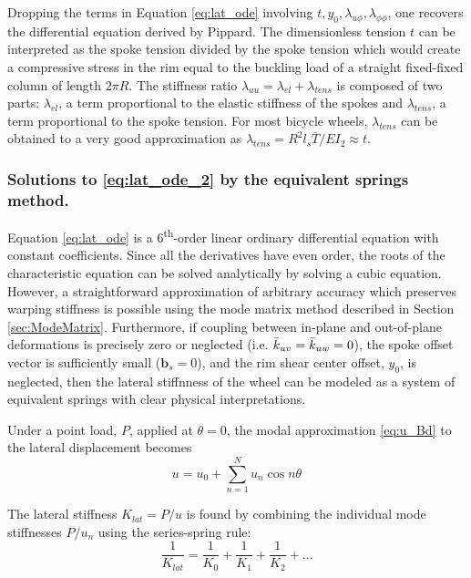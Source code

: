 \documentclass[\rootdir/thesis.tex]{subfiles}
\begin{document}
Dropping the terms in Equation \eqref{eq:lat_ode} involving $t, y_0, \lambda_{u\phi}, \lambda_{\phi\phi}$, one recovers the differential equation derived by Pippard\cite{Pippard}. The dimensionless tension $t$ can be interpreted as the spoke tension divided by the spoke tension which would create a compressive stress in the rim equal to the buckling load of a straight fixed-fixed column of length $2\pi R$. The stiffness ratio $\lambda_{uu}=\lambda_{el}+\lambda_{tens}$ is composed of two parts: $\lambda_{el}$, a term proportional to the elastic stiffness of the spokes and $\lambda_{tens}$, a term proportional to the spoke tension. For most bicycle wheels, $\lambda_{tens}$ can be obtained to a very good approximation as $\lambda_{tens} = R^2l_s\bar{T}/EI_2 \approx t$.

\subsubsection{Solutions to \eqref{eq:lat_ode_2} by the equivalent springs method.}

Equation \eqref{eq:lat_ode} is a 6\textsuperscript{th}-order linear ordinary differential equation with constant coefficients. Since all the derivatives have even order, the roots of the characteristic equation can be solved analytically by solving a cubic equation. However, a straightforward approximation of arbitrary accuracy which preserves warping stiffness is possible using the mode matrix method described in Section \ref{sec:ModeMatrix}. Furthermore, if coupling between in-plane and out-of-plane deformations is precisely zero or neglected (i.e. $\bar{k}_{uv} = \bar{k}_{uw} = 0$), the spoke offset vector is sufficiently small ($\mathbf{b}_s=0$), and the rim shear center offset, $y_0$, is neglected, then the lateral stiffnness of the wheel can be modeled as a system of equivalent springs with clear physical interpretations.

Under a point load, $P$, applied at $\theta=0$, the modal approximation \eqref{eq:u_Bd} to the lateral displacement becomes
\begin{equation}
\label{eq:u_kequiv}
u = u_0 + \sum_{n=1}^N u_n \cos{n\theta}
\end{equation}

The lateral stiffness $K_{lat}=P/u$ is found by combining the individual mode stiffnesses $P/u_n$ using the series-spring rule:
\begin{equation}
\label{eq:Klat_series}
\frac{1}{K_{lat}} = \frac{1}{K_0} + \frac{1}{K_1} + \frac{1}{K_2} + \dots
\end{equation}
\end{document}
